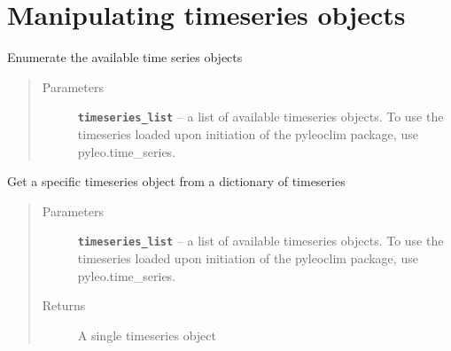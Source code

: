\documentclass[letterpaper,10pt,english]{sphinxmanual}
\begin{document}
\section{Manipulating timeseries objects}
\label{LIPDutils:manipulating-timeseries-objects}

\begin{fulllineitems}
\label{LIPDutils:pyleoclim.enumerateTs}
Enumerate the available time series objects
\begin{quote}\begin{description}
\item[{Parameters}] \leavevmode
\textbf{\texttt{timeseries\_list}} -- a  list of available timeseries objects.
To use the timeseries loaded upon initiation of the
pyleoclim package, use pyleo.time\_series.

\end{description}\end{quote}

\end{fulllineitems}


\begin{fulllineitems}
\label{LIPDutils:pyleoclim.getTs}
Get a specific timeseries object from a dictionary of timeseries
\begin{quote}\begin{description}
\item[{Parameters}] \leavevmode
\textbf{\texttt{timeseries\_list}} -- a  list of available timeseries objects.
To use the timeseries loaded upon initiation of the
pyleoclim package, use pyleo.time\_series.

\item[{Returns}] \leavevmode
A single timeseries object

\end{description}\end{quote}

\end{fulllineitems}

\end{document}
